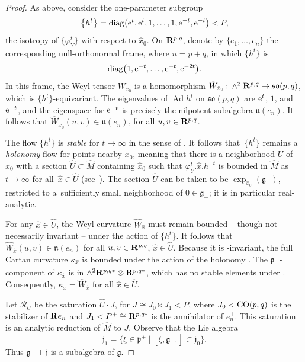 \documentclass[pdftex]{sigma}
\numberwithin{equation}{section}
\theoremstyle{definition}
\newcommand{\BR}{{\bf R}}
\newcommand{\lieg}{\mathfrak{g}}
\def\g{{\mathfrak g}}
\def\p{{\mathfrak p}}
\def\n{{\mathfrak n}}
\newcommand{\so}{\mathfrak{so}}
\newcommand{\Ad}{\operatorname{Ad}}
\begin{document}
\begin{proof}
As above, consider the one-parameter subgroup
\[\bigl\{ h^t \bigr\} = {\rm diag}\bigl({\rm e}^{t}, {\rm e}^{t}, 1, \dots, 1, {\rm e}^{-t}, {\rm e}^{-t}\bigr) < P,\]
the isotropy of $\bigl\{ \varphi^t_Y \bigr\}$ with respect to $\hat{x}_0$.
On $\BR^{p,q}$, denote by $\{ e_1, \dots, e_n \}$ the corresponding null-orthonormal frame, where $n=p+q$, in which $\bigl\{h^t \bigr\}$ is
\[{\rm diag}\bigl(1, {\rm e}^{-t}, \dots, {\rm e}^{-t}, {\rm e}^{-2t}\bigr).\]
 In this frame, the Weyl tensor $W_{x_0}$ is a homomorphism $\hat{W}_{\hat{x}_0}\colon \wedge^2 \BR^{p,q} \rightarrow \so(p,q)$, which is $\{ h^t\}$-equivariant. The eigenvalues of $\Ad h^t$ on $\so(p,q)$ are ${\rm e}^t$, $1$, and ${\rm e}^{-t}$, and the eigenspace for ${\rm e}^{-t}$ is precisely the nilpotent subalgebra $\n(e_n)$. It follows that $\hat{W}_{\hat{x}_0} (u,v) \in \n(e_n)$, for all $u,v \in \BR^{p,q}$.

The flow $\bigl\{ h^t \bigr\}$ is \emph{stable} for $t \rightarrow \infty$ in the sense of \cite[Definition~4.2]{frances.degenerescence}. It follows that~$\bigl\{ h^t \bigr\}$ remains a \emph{holonomy} flow for points nearby $x_0$, meaning that there is a neighborhood $U$ of~$x_0$ with a section $\hat{U} \subset \hat{M}$ containing $\hat{x}_0$ such that $\varphi^t_Y. \hat{x} . h^{-t}$ is bounded in $\hat{M}$ as $t \rightarrow \infty$ for all~${\hat{x} \in \hat{U}}$ (see~\cite[Proposition~2.8]{cap.me.parabolictrans}). The section $\hat{U}$ can be taken to be $\exp_{\hat{x}_0}(\g_-)$, restricted to a~sufficiently small neighborhood of $0 \in \g_-$; it is in particular real-analytic.

For any $\hat{x} \in \hat{U}$, the Weyl curvature $\hat{W}_{\hat{x}}$ must remain bounded -- though not necessarily invariant -- under the action of $\bigl\{ h^t \bigr\}$. It follows that $\hat{W}_{\hat{x}} (u,v) \in \n(e_n)$ for all $u,v \in \BR^{p,q}$, $\hat{x} \in \hat{U}$.
Because it is -invariant, the full Cartan curvature $\kappa_{\hat{x}}$ is bounded under the action of the holonomy . The $\p_+$-component of $\kappa_{\hat{x}}$ is in $\wedge^2 \BR^{p,q*} \otimes \BR^{p,q*}$, which has no stable elements under . Consequently, $\kappa_{\hat{x}} = \hat{W}_{\hat{x}}$ for all $\hat{x} \in \hat{U}$.

Let $\mathcal{R}_U$ be the saturation $\hat{U} \cdot J$, for $J \cong J_0 \ltimes J_1 < P$, where $J_0 < {\rm CO}(p,q)$ is the stabilizer of $\BR e_n$ and $J_1 < P^+ \cong \BR^{p,q*}$ is the annihilator of $e_n^\perp$.
This saturation is an analytic reduction of $\hat{M}$ to $J$.
Observe that the Lie algebra{\samepage
\[\mathfrak{j}_1 = \{ \xi \in \p^+ \mid [\xi, \lieg_{-1}] \subset \mathfrak{j}_0 \}.\]
Thus $\g_- + \mathfrak{j}$ is a subalgebra of $\g$.}


\end{proof}
\end{document}
